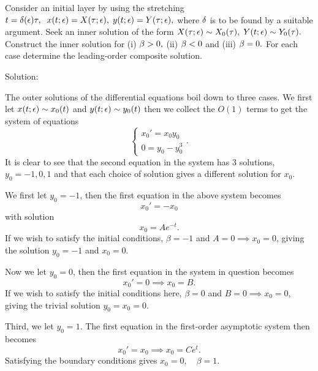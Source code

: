 \item Consider an initial layer by using the stretching $t = \delta(\epsilon) \tau,\;\; x(t;\epsilon) = X(\tau;\epsilon), \; y(t;\epsilon) = Y(\tau;\epsilon),$ where $\delta$ is to be found by a suitable argument.  Seek an inner solution of the form $X(\tau;\epsilon) \sim X_0(\tau), \; Y(t;\epsilon) \sim Y_0(\tau).$  Construct the inner solution for (i) $\beta >0,$ (ii) $\beta < 0$ and (iii) $\beta = 0.$  For each case determine the leading-order composite solution.
\eenum

Solution:\\
\benum
\item The outer solutions of the differential equations boil down to three cases. We first let $x(t;\epsilon)\sim x_0(t)$ and $y(t;\epsilon)\sim y_0(t)$ then we collect the $O(1)$ terms to get the system of equations
    $$\left\{\begin{array}{c}x_0'=x_0y_0\\0=y_0-y_0^3\end{array}\right..$$
    It is clear to see that the second equation in the system has 3 solutions, $y_0=-1,0,1$ and that each choice of solution gives a different solution for $x_0$.
    \benum
    \item We first let $y_0=-1$, then the first equation in the above system becomes
    $$x_0'=-x_0 $$
    with solution
    $$x_0=Ae^{-t}.$$
    If we wish to satisfy the initial conditions, $\beta=-1$ and $A=0\implies x_0=0$, giving the solution $y_0=-1$ and $x_0=0$.
    \item Now we let $y_0=0$, then the first equation in the system in question becomes
    $$x_0'=0\implies x_0=B.$$
    If we wish to satisfy the initial conditions here, $\beta=0$ and $B=0\implies x_0=0$, giving the trivial solution $y_0=x_0=0.$
    \item Third, we let $y_0=1.$ The first equation in the first-order asymptotic system then becomes
    $$x_0'=x_0\implies x_0=Ce^t.$$
    Satisfying the boundary conditions gives $x_0=0,\quad\beta=1$.
    \eenum


